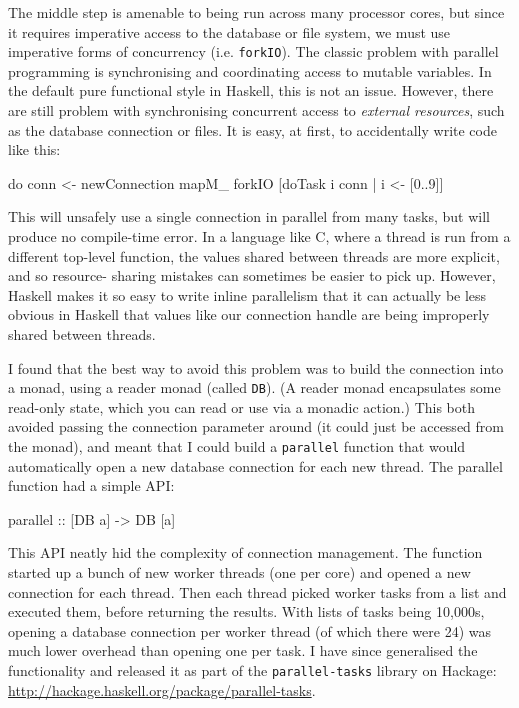 \documentclass{tmr}
\begin{document}
The middle step is amenable to being run across many processor cores, but since it requires imperative access to the database or file system, we must use imperative forms of concurrency (i.e. \lstinline|forkIO|).  The classic problem with parallel programming is synchronising and coordinating access to mutable variables.  In the default pure functional style in Haskell, this is not an issue. However, there are still problem with synchronising concurrent access to \textit{external resources}, such as the database connection or files.  It is easy, at first, to accidentally write code like this:

\begin{code}
do conn <- newConnection
   mapM_ forkIO [doTask i conn | i <- [0..9]]
\end{code}

This will unsafely use a single connection in parallel from many tasks, but will produce no compile-time error.  In a language like C, where a thread is run from a different top-level function, the values shared between threads are more explicit, and so resource- sharing mistakes can sometimes be easier to pick up.  However, Haskell makes it so easy to write inline parallelism that it can actually be less obvious in Haskell that values like our connection handle are being improperly shared between threads.

I found that the best way to avoid this problem was to build the connection into a monad, using a reader monad (called \lstinline|DB|).  (A reader monad encapsulates some read-only state, which you can read or use via a monadic action.)  This both avoided passing the connection parameter around (it could just be accessed from the monad), and meant that I could build a \lstinline|parallel| function that would automatically open a new database connection for each new thread.  The parallel function had a simple API\@:

\begin{code}
parallel :: [DB a] -> DB [a]
\end{code}

This API neatly hid the complexity of connection management.  The function started up a bunch of new worker threads (one per core) and opened a new connection for each thread.  Then each thread picked worker tasks from a list and executed them, before returning the results.  With lists of tasks being 10,000s, opening a database connection per worker thread (of which there were 24) was much lower overhead than opening one per task.  I have since generalised the functionality and released it as part of the \texttt{parallel-tasks} library on Hackage: \url{http://hackage.haskell.org/package/parallel-tasks}.
\end{document}
